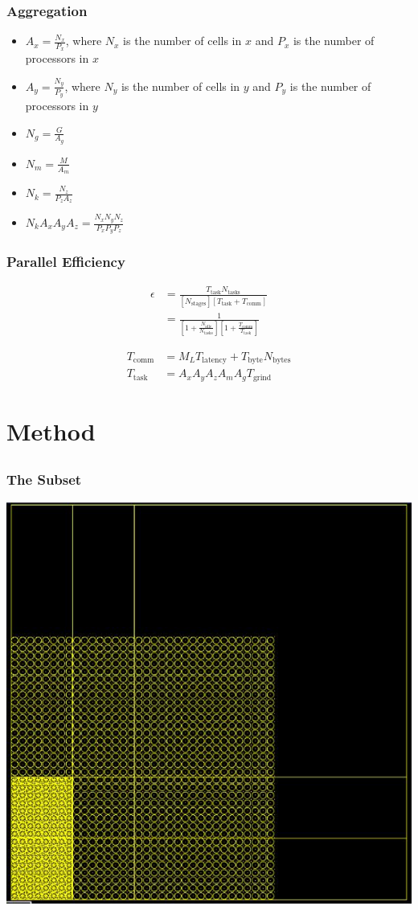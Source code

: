 \documentclass[]{beamer}
\begin{document}
\begin{frame}[t]\frametitle{Aggregation}
\begin{block}{}
		\begin{itemize}
		\item $A_x = \frac{N_x}{P_x}$, where $N_x$ is the number of cells in $x$ and $P_x$ is the number of processors in $x$
		\item $A_y = \frac{N_y}{P_y}$, where $N_y$ is the number of cells in $y$ and $P_y$ is the number of processors in $y$
		\item $N_g = \frac{G}{A_g}$
		\item $N_m = \frac{M}{A_m}$
		\item $N_k = \frac{N_z}{P_z A_z}$
		\item $N_k A_x A_y A_z = \frac{N_x N_y N_z}{P_x P_y P_z}$
		\end{itemize}
	\end{block}
\end{frame}

\begin{frame}[t]\frametitle{Parallel Efficiency}
\begin{block}{}
\begin{align*}
\epsilon &= \frac{T_{\text{task}} N_{\text{tasks}}}{[N_{\text{stages}}] [T_{\text{task}} + T_{\text{comm}}]} \\
 &=\frac{1}{[1+\frac{N_{\text{idle}}}{N_{\text{tasks}}}][1 + \frac{T_{\text{comm}}}{T_{\text{task}}}]}
\end{align*}
\end{block}
\begin{block}{}
\begin{align*}
T_{\text{comm}} &= M_L T_{\text{latency}} + T_{\text{byte}} N_{\text{bytes}} \\
T_{\text{task}} &= A_x A_y A_z A_m A_g T_{\text{grind}}
\end{align*}
\end{block}
\end{frame}

\section{Method}
\subsection{}
\begin{frame}[t]\frametitle{The Subset}
\centering
\includegraphics[width = 12 cm, height = 7 cm ]{figures/subsetlattice.png}
\end{frame}
\end{document}
